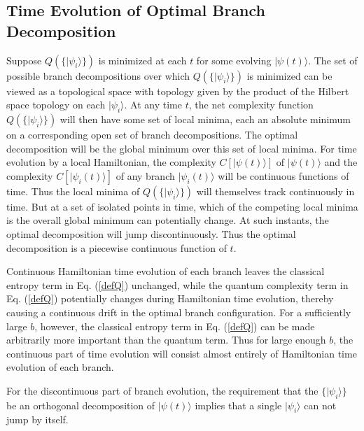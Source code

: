 \documentclass[12pt,amsmath,amssymb,onecolumn]{revtex4-2}
\begin{document}
\subsection{\label{subsec:timeevolution} Time Evolution of Optimal Branch Decomposition}


Suppose $Q(\{|\psi_i \rangle \})$ is minimized at each $t$ for
some evolving $|\psi(t) \rangle $.
The set of possible 
branch decompositions over which $Q(\{|\psi_i \rangle \})$ is
minimized can be viewed as a topological space with
topology given by the product of
the Hilbert space topology on each $|\psi_i \rangle $.
At any time $t$,
the net complexity function $Q(\{|\psi_i \rangle \})$ will then have
some set of local minima, each an absolute minimum on
a corresponding open set of branch decompositions.
The optimal
decomposition will be the global minimum over this
set of local minima. 
For time evolution by a  local Hamiltonian,
the complexity $C[|\psi(t) \rangle ]$ of $|\psi(t) \rangle $ and the complexity $C[|\psi_i(t) \rangle ]$ of
any branch $|\psi_i(t) \rangle $ will be continuous functions of time.
Thus the local minima of $Q(\{|\psi_i \rangle \})$ will
themselves track continuously in time.
But at a
set of isolated points in time, which of the competing
local minima is the overall global minimum can potentially change.
At such instants, the optimal decomposition
will jump discontinuously. Thus the optimal decomposition
is a piecewise continuous function of $t$.

Continuous Hamiltonian time evolution of each branch
leaves the classical entropy term in Eq. (\ref{defQ}) unchanged,
while the quantum complexity term in Eq. (\ref{defQ}) potentially changes 
during Hamiltonian time evolution, thereby causing a continuous drift in
the optimal branch configuration.
For a sufficiently large $b$, however, the classical
entropy term in Eq. (\ref{defQ}) can be made arbitrarily more important than
the quantum term.
Thus for large enough $b$, the continuous part of time evolution
will consist almost entirely of Hamiltonian time evolution of each branch.

For the discontinuous part of branch evolution,
the requirement that the $\{ |\psi_i \rangle  \}$ be an orthogonal
decomposition of $|\psi(t) \rangle $ implies that a single $|\psi_i \rangle $
can not jump by itself.
\end{document}

